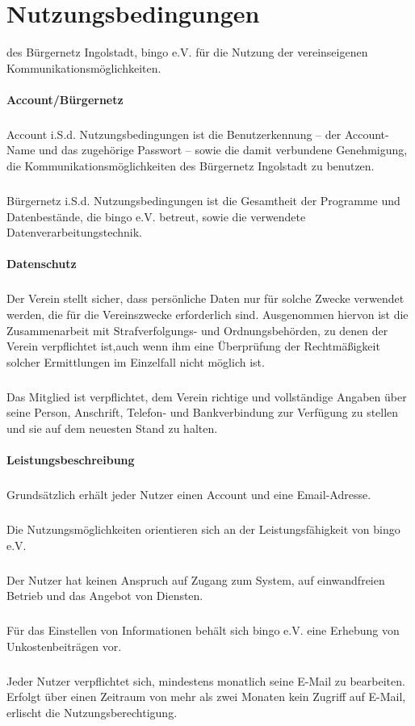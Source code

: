 \section{Nutzungsbedingungen}
des Bürgernetz Ingolstadt, bingo e.V. für die Nutzung der vereinseigenen Kommunikationsmöglichkeiten.

\begin{multicols}{2}

\paragraph{Account/Bürgernetz}
\subparagraph{} Account i.S.d. Nutzungsbedingungen ist die Benutzerkennung – der Account-
Name und das zugehörige Passwort – sowie die damit verbundene
Genehmigung, die Kommunikationsmöglichkeiten des Bürgernetz Ingolstadt
zu benutzen.
\subparagraph{} Bürgernetz i.S.d. Nutzungsbedingungen ist die Gesamtheit der Programme
und Datenbestände, die bingo e.V. betreut, sowie die verwendete
Datenverarbeitungstechnik.

\paragraph{Datenschutz}
\subparagraph{} Der Verein stellt sicher, dass persönliche Daten nur für solche Zwecke
verwendet werden, die für die Vereinszwecke erforderlich sind.
Ausgenommen hiervon ist die Zusammenarbeit mit Strafverfolgungs- und
Ordnungsbehörden, zu denen der Verein verpflichtet ist,auch wenn ihm eine
Überprüfung der Rechtmäßigkeit solcher Ermittlungen im Einzelfall nicht
möglich ist.
\subparagraph{} Das Mitglied ist verpflichtet, dem Verein richtige und vollständige Angaben
über seine Person, Anschrift, Telefon- und Bankverbindung zur Verfügung zu
stellen und sie auf dem neuesten Stand zu halten.

\paragraph{Leistungsbeschreibung}
\subparagraph{} Grundsätzlich erhält jeder Nutzer einen Account und eine Email-Adresse.
\subparagraph{} Die Nutzungsmöglichkeiten orientieren sich an der Leistungsfähigkeit von bingo e.V.
\subparagraph{} Der Nutzer hat keinen Anspruch auf Zugang zum System, auf einwandfreien
Betrieb und das Angebot von Diensten.
\subparagraph{} Für das Einstellen von Informationen behält sich bingo e.V. eine Erhebung
von Unkostenbeiträgen vor.
\subparagraph{} Jeder Nutzer verpflichtet sich, mindestens monatlich seine E-Mail zu
bearbeiten. Erfolgt über einen Zeitraum von mehr als zwei Monaten kein
Zugriff auf E-Mail, erlischt die Nutzungsberechtigung.


\end{multicols}
